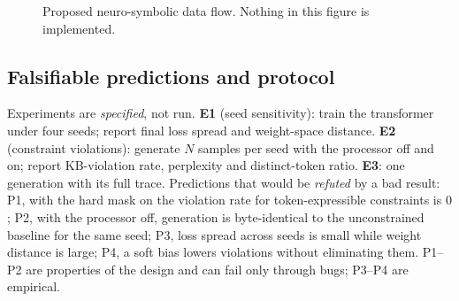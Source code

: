 \documentclass[conference]{IEEEtran}
\begin{document}
\begin{figure}[t]
\centering
{}
\caption{Proposed neuro-symbolic data flow. Nothing in this figure is implemented.}
\label{fig:ns}
\end{figure}

\subsection{Falsifiable predictions and protocol}
Experiments are \emph{specified}, not run. \textbf{E1} (seed sensitivity): train the transformer under four seeds; report final loss spread and weight-space distance. \textbf{E2} (constraint violations): generate $N$ samples per seed with the processor off and on; report KB-violation rate, perplexity and distinct-token ratio. \textbf{E3}: one generation with its full trace. Predictions that would be \emph{refuted} by a bad result: P1, with the hard mask on the violation rate for token-expressible constraints is $0$; P2, with the processor off, generation is byte-identical to the unconstrained baseline for the same seed; P3, loss spread across seeds is small while weight distance is large; P4, a soft bias lowers violations without eliminating them. P1--P2 are properties of the design and can fail only through bugs; P3--P4 are empirical.
\end{document}
